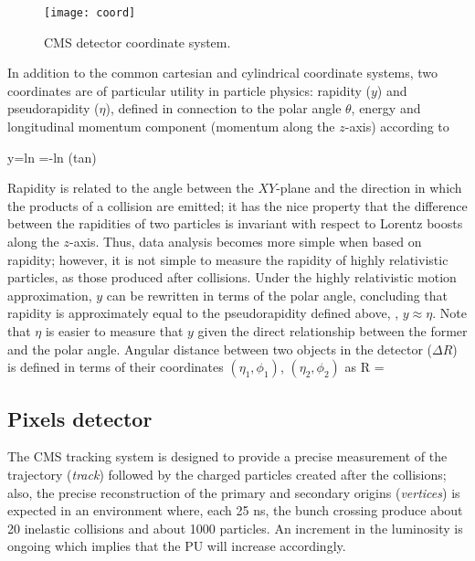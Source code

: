 \begin{figure}[h!]
  \centering
  \texttt{[image: coord]}
  \caption[CMS detector coordinate system]{CMS detector coordinate system.}
  \label{fig:coord}
\end{figure}

\noindent In addition to the common cartesian and cylindrical coordinate systems, two coordinates are of particular utility in particle physics: rapidity ($y$) and pseudorapidity ($\eta$), defined in connection to the polar angle $\theta$, energy and longitudinal momentum component (momentum along the $z$-axis) according to

\beqn
y=ln \qquad \eta=-ln \left(tan\right)
\label{eqn:eta}
\eeqn

\noindent Rapidity is related to the angle between the $XY$-plane and the direction in which the products of a collision are emitted; it has the nice property that the difference between the rapidities of two particles is invariant with respect to Lorentz boosts along the $z$-axis. Thus, data analysis becomes more simple when based on rapidity; however, it is not simple to measure the rapidity of highly relativistic particles, as those produced after \pp collisions. Under the highly relativistic motion approximation, $y$ can be rewritten in terms of the polar angle, concluding that rapidity is approximately equal to the pseudorapidity defined above, \ie, $y\approx\eta$. Note that $\eta$ is easier to measure that $y$ given the direct relationship between the former and the polar angle. Angular distance between two objects in the detector ($\Delta R$) is defined in terms of their coordinates $(\eta_1,\phi_1)$, $(\eta_2,\phi_2)$ as
\beqn
\Delta R = 
\label{delta_r}
\eeqn

\subsection{Pixels detector}

\noindent  The CMS tracking system is designed to provide a precise measurement of the trajectory (\textit{track}) followed by the charged particles created after the \pp collisions; also, the precise reconstruction of the primary and secondary origins (\textit{vertices}) is expected in an environment where, each 25 ns, the bunch crossing produce about 20 inelastic collisions and about 1000 particles. An increment in the luminosity is ongoing which implies that the PU will increase accordingly. \\


